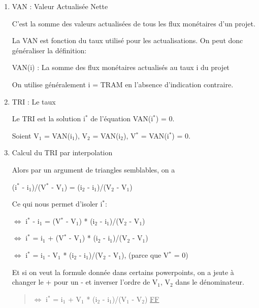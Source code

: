 \documentclass[11pt]{article}
\begin{document}
\begin{enumerate}
\item VAN : Valeur Actualisée Nette
\label{sec:org5057e0b}

C'est la somme des valeurs actualisées de tous les flux monétaires d'un projet.

La VAN est fonction du taux utilisé pour les actualisations.  On peut donc
généraliser la définition:

VAN(i) : La somme des flux monétaires actualisés au taux i du projet

On utilise généralement i = TRAM en l'absence d'indication contraire.

\item TRI : Le taux
\label{sec:org63da956}

Le TRI est la solution i\(^{\text{*}}\) de l'équation VAN(i\(^{\text{*}}\)) = 0.

Soient V\(_{\text{1}}\) = VAN(i\(_{\text{1}}\)), V\(_{\text{2}}\) = VAN(i\(_{\text{2}}\)), V\(^{\text{*}}\) = VAN(i\(^{\text{*}}\)) = 0.

\item Calcul du TRI par interpolation
\label{sec:org5554cf8}

Alors par un argument de triangles semblables, on a

(i\(^{\text{*}}\) - i\(_{\text{1}}\))/(V\(^{\text{*}}\) - V\(_{\text{1}}\)) = (i\(_{\text{2}}\) - i\(_{\text{1}}\))/(V\(_{\text{2}}\) - V\(_{\text{1}}\))

Ce qui nous permet d'isoler i\(^{\text{*}}\):

\(\Leftrightarrow\) i\(^{\text{*}}\) - i\(_{\text{1}}\) = (V\(^{\text{*}}\) - V\(_{\text{1}}\)) * (i\(_{\text{2}}\) - i\(_{\text{1}}\))/(V\(_{\text{2}}\) - V\(_{\text{1}}\))

\(\Leftrightarrow\) i\(^{\text{*}}\) =  i\(_{\text{1}}\) + (V\(^{\text{*}}\) - V\(_{\text{1}}\)) * (i\(_{\text{2}}\) - i\(_{\text{1}}\))/(V\(_{\text{2}}\) - V\(_{\text{1}}\))

\(\Leftrightarrow\) i\(^{\text{*}}\) =  i\(_{\text{1}}\) - V\(_{\text{1}}\) * (i\(_{\text{2}}\) - i\(_{\text{1}}\))/(V\(_{\text{2}}\) - V\(_{\text{1}}\)),  (parce que V\(^{\text{*}}\) = 0)

Et si on veut la formule donnée dans certains powerpoints, on a jsute à changer
le + pour un - et inverser l'ordre de V\(_{\text{1}}\), V\(_{\text{2}}\) dans le dénominateur.

\begin{quote}
\(\Leftrightarrow\) i\(^{\text{*}}\) =  i\(_{\text{1}}\) + V\(_{\text{1}}\) * (i\(_{\text{2}}\) - i\(_{\text{1}}\))/(V\(_{\text{1}}\) - V\(_{\text{2}}\)) \uline{FF}
\end{quote}


\end{enumerate}
\end{document}
